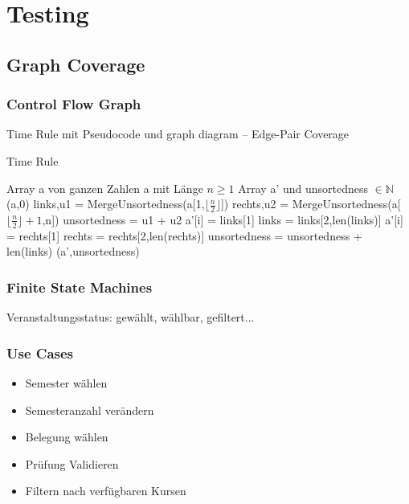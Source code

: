 \documentclass[ngerman]{article}
\begin{document}
\section{Testing}

\subsection{Graph Coverage}

\subsubsection{Control Flow Graph}
Time Rule mit Pseudocode und graph diagram -- Edge-Pair Coverage
\begin{algorithm}
\caption{Time Rule}
\begin{algorithmic}[1]
    \REQUIRE Array a von ganzen Zahlen a mit Länge $n \geq 1$
    \ENSURE Array a' und unsortedness $\in \mathbb{N}$
        \RETURN (a,0)
    \ENDIF
    \STATE links,u1 = MergeUnsortedness(a[1,$\lfloor\frac{n}{2}\rfloor$])
    \STATE rechts,u2 = MergeUnsortedness(a[$\lfloor\frac{n}{2}\rfloor+1$,n])
    \STATE unsortedness = u1 + u2
            \STATE a'[i] = links[1]
            \STATE links = links[2,len(links)]
        \ELSE
            \STATE a'[i] = rechts[1]
            \STATE rechts = rechts[2,len(rechts)]
            \STATE unsortedness = unsortedness + len(links)
        \ENDIF
    \ENDFOR
    \RETURN (a',unsortedness)
\end{algorithmic}
\end{algorithm}

\subsubsection{Finite State Machines}
Veranstaltungsstatus: gewählt, wählbar, gefiltert...


\subsubsection{Use Cases}

\begin{itemize}
    \item Semester wählen
    \item Semesteranzahl verändern
    \item Belegung wählen
    \item Prüfung Validieren
    \item Filtern nach verfügbaren Kursen
\end{itemize}
\end{document}
